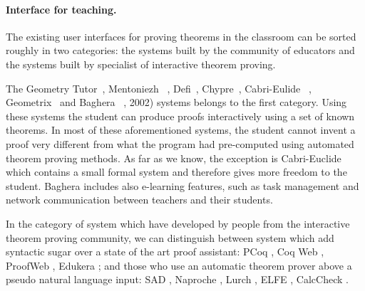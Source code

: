 \paragraph*{Interface for teaching.}

The existing user interfaces for proving theorems in the classroom can be sorted roughly in two categories: 
the systems built by the community of educators and the systems built by specialist of interactive theorem proving.

The Geometry Tutor~\cite{anderson_geometry_1985}, Mentoniezh
~\cite{py_reconnaissance_1990},
Defi~\cite{ag-almouloud_ordinateur_1992},
Chypre~\cite{bernat_chypre:_1993}, Cabri-Eulide
~\cite{luengo_cabri-euclide:_1997},
Geometrix~\cite{gressier_geometrix_1988} and Baghera
~\cite{balacheff_baghera_1999}, 2002) systems belongs to the first
category. Using these systems the student can produce proofs
interactively using a set of known theorems.  In most of these
aforementioned systems, the student cannot invent a proof very
different from what the program had pre-computed using automated
theorem proving methods. As far as we know, the exception is
Cabri-Euclide which contains a small formal system and therefore gives
more freedom to the student. Baghera includes also e-learning
features, such as task management and network communication between
teachers and their students.

In the category of system which have developed by people from the
interactive theorem proving community, we can distinguish between
system which add syntactic sugar over a state of the art proof
assistant: PCoq \cite{amerkad_mathematics_2001}, Coq Web
\cite{blanc_proofs_2007}, ProofWeb \cite{kaliszyk_deduction_2008},
Edukera \cite{rognier_presentation_2016}; and those who use an
automatic theorem prover above a pseudo natural language input: SAD
\cite{lyaletski_sad_2006}, Naproche \cite{cramer_naproche_2010}, Lurch
\cite{carter_lurch:_nodate}, ELFE \cite{dore_elfe_2018}, CalcCheck
\cite{kahl_calccheck:_2018}.

